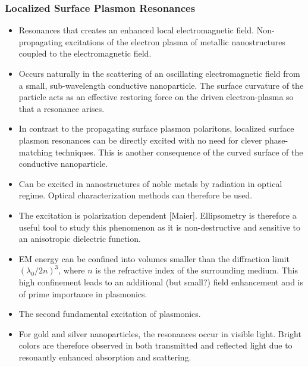 \subsubsection{Localized Surface Plasmon Resonances}
\begin{itemize}
    \item Resonances that creates an enhanced local electromagnetic field. Non-propagating excitations of the electron plasma of metallic nanostructures coupled to the electromagnetic field.
    
    \item Occurs naturally in the scattering of an oscillating electromagnetic field from a small, sub-wavelength conductive nanoparticle. The surface curvature of the particle acts as an effective restoring force on the driven electron-plasma so that a resonance arises. 
    
    \item In contrast to the propagating surface plasmon polaritons, localized surface plasmon resonances can be directly excited with no need for clever phase-matching techniques. This is another consequence of the curved surface of the conductive nanoparticle.

    \item Can be excited in nanostructures of noble metals by radiation in optical regime. Optical characterization methods can therefore be used.
    
    \item The excitation is polarization dependent [Maier]. Ellipsometry is therefore a useful tool to study this phenomenon as it is non-destructive and sensitive to an anisotropic dielectric function. 
    
    \item EM energy can be confined into volumes smaller than the diffraction limit $(\lambda_0/2n)^3$, where $n$ is the refractive index of the surrounding medium. This high confinement leads to an additional (but small?) field enhancement and is of prime importance in plasmonics.
    
    \item The second fundamental excitation of plasmonics.
    
    \item For gold and silver nanoparticles, the resonances occur in visible light. Bright colors are therefore observed in both transmitted and reflected light due to resonantly enhanced absorption and scattering.
    
\end{itemize}

